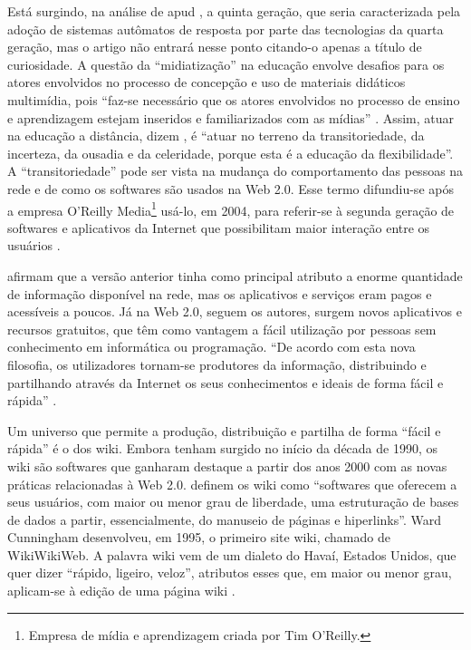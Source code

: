 \documentclass{textolivre}
\begin{document}
Está surgindo, na análise de \textcite{taylor2001} apud \cite[p. 25]{santos2009}, a quinta geração, que seria caracterizada pela adoção de sistemas autômatos de resposta por parte das tecnologias da quarta geração, mas o artigo não entrará nesse ponto citando-o apenas a título de curiosidade. A questão da “midiatização” na educação envolve desafios para os atores envolvidos no processo de concepção e uso de materiais didáticos multimídia, pois “faz-se necessário que os atores envolvidos no processo de ensino e aprendizagem estejam inseridos e familiarizados com as mídias” \cite[p. 97]{oliveira2016}. Assim, atuar na educação a distância, dizem \textcite[p. 99]{oliveira2016}, é “atuar no terreno da transitoriedade, da incerteza, da ousadia e da celeridade, porque esta é a educação da flexibilidade”. A “transitoriedade” pode ser vista na mudança do comportamento das pessoas na rede e de como os softwares são usados na Web 2.0. Esse termo difundiu-se após a empresa O’Reilly Media\footnote{Empresa de mídia e aprendizagem criada por Tim O'Reilly.} usá-lo, em 2004, para referir-se à segunda geração de softwares e aplicativos da Internet que possibilitam maior interação entre os usuários \cite[p. 283]{lucena2016}. 

\textcite[p. 71]{junior2017} afirmam que a versão anterior tinha como principal atributo a enorme quantidade de informação disponível na rede, mas os aplicativos e serviços eram pagos e acessíveis a poucos. Já na Web 2.0, seguem os autores, surgem novos aplicativos e recursos gratuitos, que têm como vantagem a fácil utilização por pessoas sem conhecimento em informática ou programação. “De acordo com esta nova filosofia, os utilizadores tornam-se produtores da informação, distribuindo e partilhando através da Internet os seus conhecimentos e ideais de forma fácil e rápida” \cite[p. 72]{junior2017}.

Um universo que permite a produção, distribuição e partilha de forma “fácil e rápida” é o dos wiki. Embora tenham surgido no início da década de 1990, os wiki são softwares que ganharam destaque a partir dos anos 2000 com as novas práticas relacionadas à Web 2.0. \textcite[p. 114]{amiel2015} definem os wiki como “softwares que oferecem a seus usuários, com maior ou menor grau de liberdade, uma estruturação de bases de dados a partir, essencialmente, do manuseio de páginas e hiperlinks”. Ward Cunningham desenvolveu, em 1995, o primeiro site wiki, chamado de WikiWikiWeb. A palavra wiki vem de um dialeto do Havaí, Estados Unidos, que quer dizer “rápido, ligeiro, veloz”, atributos esses que, em maior ou menor grau, aplicam-se à edição de uma página wiki \cite[p. 78]{moraes2016}. 
\end{document}
